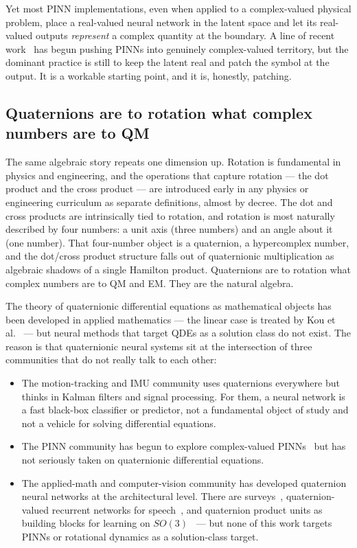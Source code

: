 \documentclass[11pt]{article}
\begin{document}
Yet most PINN implementations, even when applied to a complex-valued physical problem, place a real-valued neural network in the latent space and let its real-valued outputs \emph{represent} a complex quantity at the boundary. A line of recent work~\cite{CompleXPINN2025} has begun pushing PINNs into genuinely complex-valued territory, but the dominant practice is still to keep the latent real and patch the symbol at the output. It is a workable starting point, and it is, honestly, patching.

\subsection{Quaternions are to rotation what complex numbers are to QM}

The same algebraic story repeats one dimension up. Rotation is fundamental in physics and engineering, and the operations that capture rotation --- the dot product and the cross product --- are introduced early in any physics or engineering curriculum as separate definitions, almost by decree. The dot and cross products are intrinsically tied to rotation, and rotation is most naturally described by four numbers: a unit axis (three numbers) and an angle about it (one number). That four-number object is a quaternion, a hypercomplex number, and the dot/cross product structure falls out of quaternionic multiplication as algebraic shadows of a single Hamilton product. Quaternions are to rotation what complex numbers are to QM and EM. They are the natural algebra.

The theory of quaternionic differential equations as mathematical objects has been developed in applied mathematics --- the linear case is treated by Kou et al.~\cite{Kou2018QDE} --- but neural methods that target QDEs as a solution class do not exist. The reason is that quaternionic neural systems sit at the intersection of three communities that do not really talk to each other:

\begin{itemize}
\item The motion-tracking and IMU community uses quaternions everywhere but thinks in Kalman filters and signal processing. For them, a neural network is a fast black-box classifier or predictor, not a fundamental object of study and not a vehicle for solving differential equations.
\item The PINN community has begun to explore complex-valued PINNs~\cite{CompleXPINN2025} but has not seriously taken on quaternionic differential equations.
\item The applied-math and computer-vision community has developed quaternion neural networks at the architectural level. There are surveys~\cite{Parcollet2020Survey}, quaternion-valued recurrent networks for speech~\cite{Parcollet_speech_QNN}, and quaternion product units as building blocks for learning on $SO(3)$~\cite{Zhang2020QPU} --- but none of this work targets PINNs or rotational dynamics as a solution-class target.
\end{itemize}
\end{document}
